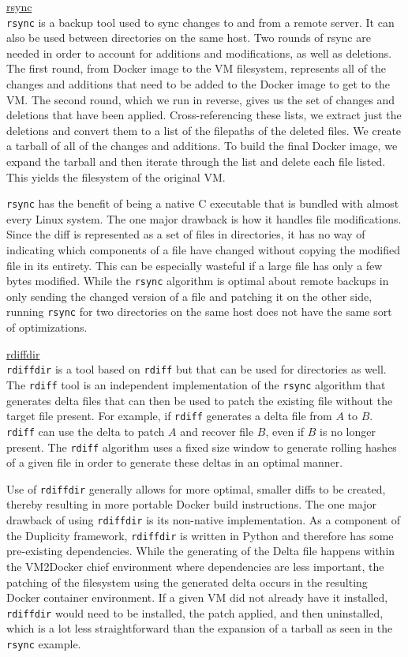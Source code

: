\underline{rsync}\\
\texttt{rsync} is a backup tool used to sync changes to and from a remote server. It can also be used between directories on the same host. Two rounds of rsync are needed in order to account for additions and modifications, as well as deletions. The first round, from Docker image to the VM filesystem, represents all of the changes and additions that need to be added to the Docker image to get to the VM. The second round, which we run in reverse, gives us the set of changes and deletions that have been applied. Cross-referencing these lists, we extract just the deletions and convert them to a list of the filepaths of the deleted files. We create a tarball of all of the changes and additions. To build the final Docker image, we expand the tarball and then iterate through the list and delete each file listed. This yields the filesystem of the original VM. 

\texttt{rsync} has the benefit of being a native C executable that is bundled with almost  every Linux system. The one major drawback is how it handles file modifications. Since the diff is represented as a set of files in directories, it has no way of indicating which components of a file have changed without copying the modified file in its entirety. This can be especially wasteful if a large file has only a few bytes modified. While the \texttt{rsync} algorithm is optimal about remote backups in only sending the changed version of a file and patching it on the other side, running \texttt{rsync} for two directories on the same host does not have the same sort of optimizations.

\underline{rdiffdir}\\
\label{sec:rdiffdir}
\texttt{rdiffdir} is a tool based on \texttt{rdiff} but that can be used for directories as well. The \texttt{rdiff} tool is an independent implementation of the \texttt{rsync} algorithm that generates delta files that can then be used to patch the existing file without the target file present. For example, if \texttt{rdiff} generates a delta file from $A$ to $B$. \texttt{rdiff} can use the delta to patch $A$ and recover file $B$, even if $B$ is no longer present. The \texttt{rdiff} algorithm uses a fixed size window to generate rolling hashes of a given file in order to generate these deltas in an optimal manner.

Use of \texttt{rdiffdir} generally allows for more optimal, smaller diffs to be created, thereby resulting in more portable Docker build instructions. The one major drawback of using \texttt{rdiffdir} is its non-native implementation. As a component of the Duplicity framework, \texttt{rdiffdir} is written in Python and therefore has some pre-existing dependencies. While the generating of the Delta file happens within the VM2Docker chief environment where dependencies are less important, the patching of the filesystem using the generated delta occurs in the resulting Docker container environment. If a given VM did not already have it installed, \texttt{rdiffdir} would need to be installed, the patch applied, and then uninstalled, which is a lot less straightforward than the expansion of a tarball as seen in the \texttt{rsync} example.


